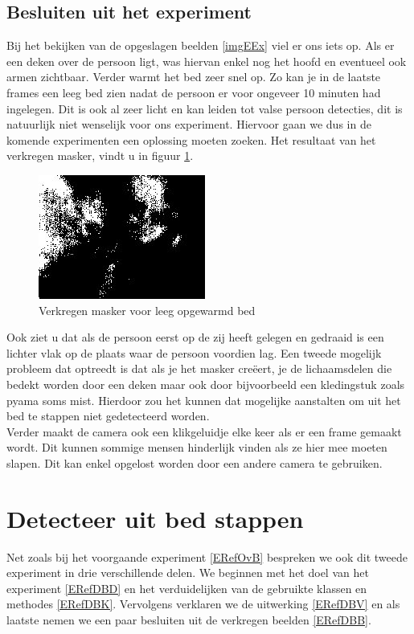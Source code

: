 \subsection{Besluiten uit het experiment}
\label{ERefOBB}
 Bij het bekijken van de opgeslagen beelden \ref{imgEEx} viel er ons iets op. Als er een deken over de persoon ligt, was hiervan enkel nog het hoofd en eventueel ook armen zichtbaar. Verder warmt het bed zeer snel op. Zo kan je in de laatste frames een leeg bed zien nadat de persoon er voor ongeveer 10 minuten had ingelegen. Dit is ook al zeer licht en kan leiden tot valse persoon detecties, dit is natuurlijk niet wenselijk voor ons experiment. Hiervoor gaan we dus in de komende experimenten een oplossing moeten zoeken. Het resultaat van het verkregen masker, vindt u in figuur \ref{imgCOB}.
\begin{figure}[h]
	\includegraphics[scale = 0.75]{EersteExperiment_mask10}
	\caption{Verkregen masker voor leeg opgewarmd bed}
	\label{imgCOB}
\end{figure}
Ook ziet u dat als de persoon eerst op de zij heeft gelegen en gedraaid is een lichter vlak op de plaats waar de persoon voordien lag.
Een tweede mogelijk probleem dat optreedt is dat als je het masker cre\"eert, je de lichaamsdelen die bedekt worden door een deken maar ook door bijvoorbeeld een kledingstuk zoals pyama soms mist. Hierdoor zou het kunnen dat mogelijke aanstalten om uit het bed te stappen niet gedetecteerd worden. \\
Verder maakt de camera ook een klikgeluidje elke keer als er een frame gemaakt wordt. Dit kunnen sommige mensen hinderlijk vinden als ze hier mee moeten slapen. Dit kan enkel opgelost worden door een andere camera te gebruiken.  

\section{Detecteer uit bed stappen}
\label{ERefDUB}
Net zoals bij het voorgaande experiment \ref{ERefOvB} bespreken we ook dit tweede experiment in drie verschillende delen. We beginnen met het doel van het experiment \ref{ERefDBD} en het verduidelijken van de gebruikte klassen en methodes \ref{ERefDBK}. Vervolgens verklaren we de uitwerking \ref{ERefDBV} en als laatste nemen we een paar besluiten uit de verkregen beelden \ref{ERefDBB}. 

